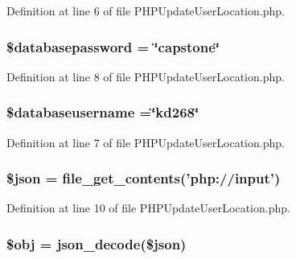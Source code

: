 Definition at line 6 of file P\-H\-P\-Update\-User\-Location.\-php.

\hypertarget{_p_h_p_update_user_location_8php_a1a07536b6a5f43f2d8f826bd2ee6c91a}{
\subsubsection[{\$databasepassword}]{\setlength{\rightskip}{0pt plus 5cm}\$databasepassword = \char`\"{}capstone\char`\"{}}}\label{_p_h_p_update_user_location_8php_a1a07536b6a5f43f2d8f826bd2ee6c91a}


Definition at line 8 of file P\-H\-P\-Update\-User\-Location.\-php.

\hypertarget{_p_h_p_update_user_location_8php_a251bf75f510d7c8b556c65d7c30e911f}{
\subsubsection[{\$databaseusername}]{\setlength{\rightskip}{0pt plus 5cm}\$databaseusername =\char`\"{}kd268\char`\"{}}}\label{_p_h_p_update_user_location_8php_a251bf75f510d7c8b556c65d7c30e911f}


Definition at line 7 of file P\-H\-P\-Update\-User\-Location.\-php.

\hypertarget{_p_h_p_update_user_location_8php_acedd13b51401130848ce18f4d5c52605}{
\subsubsection[{\$json}]{\setlength{\rightskip}{0pt plus 5cm}\$json = file\-\_\-get\-\_\-contents('php\-://input')}}\label{_p_h_p_update_user_location_8php_acedd13b51401130848ce18f4d5c52605}


Definition at line 10 of file P\-H\-P\-Update\-User\-Location.\-php.

\hypertarget{_p_h_p_update_user_location_8php_a9008ed94ba185855b1723e367744b87e}{
\subsubsection[{\$obj}]{\setlength{\rightskip}{0pt plus 5cm}\$obj = json\-\_\-decode(\$json)}}\label{_p_h_p_update_user_location_8php_a9008ed94ba185855b1723e367744b87e}


